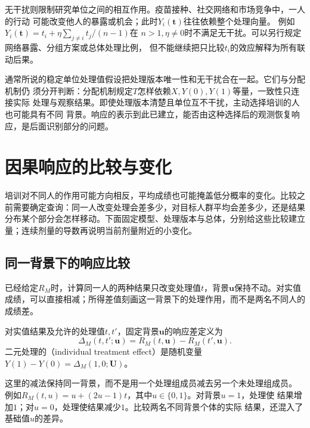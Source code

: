 无干扰则限制研究单位之间的相互作用。疫苗接种、社交网络和市场竞争中，一人的行动
可能改变他人的暴露或机会；此时\(Y_i(\bm t)\)往往依赖整个处理向量。
例如\(Y_i(\bm t)=t_i+\eta\sum_{j\ne i}t_j/(n-1)\)在
\(n>1,\eta\ne0\)时不满足无干扰。可以另行规定网络暴露、分组方案或总体处理比例，
但不能继续把只比较\(t_i\)的效应解释为所有联动后果。

通常所说的稳定单位处理值假设把处理版本唯一性和无干扰合在一起。它们与分配机制仍
须分开判断：分配机制规定\(T\)怎样依赖\(X,Y(0),Y(1)\)等量，一致性只连接实际
处理与观察结果。即使处理版本清楚且单位互不干扰，主动选择培训的人也可能具有不同
背景。响应的表示到此已建立，能否由这种选择后的观测恢复响应，是后面识别部分的问题。

\section{因果响应的比较与变化}
\label{sec:causal-response-comparison}

培训对不同人的作用可能方向相反，平均成绩也可能掩盖低分概率的变化。比较之前需要确定查询：同一人改变处理会差多少，对目标人群平均会差多少，还是结果分布某个部分会怎样移动。下面固定模型、处理版本与总体，分别给这些比较建立量；连续剂量的导数再说明当前剂量附近的小变化。

\subsection{同一背景下的响应比较}
\label{sec:causal-individual-response}

已经给定\(R_M\)时，计算同一人的两种结果只改变处理值\(t\)，背景\(\bm u\)保持不动。对实值成绩，可以直接相减；所得差值刻画这一背景下的处理作用，而不是两名不同人的成绩差。

\begin{definition}[同一背景下的响应差]
  \label{def:causal-individual-effect}
  对实值结果及允许的处理值\(t,t'\)，固定背景\(\bm u\)的响应差定义为
  \begin{equation}
    \Delta_M(t,t';\bm u)=R_M(t,\bm u)-R_M(t',\bm u).
    \label{eq:causal-individual-response-difference}
  \end{equation}
  二元处理的（individual treatment effect）是随机变量
  \(Y(1)-Y(0)=\Delta_M(1,0;\bm U)\)。
\end{definition}

这里的减法保持同一背景，而不是用一个处理组成员减去另一个未处理组成员。
例如\(R_M(t,u)=u+(2u-1)t\)，其中\(u\in\{0,1\}\)。对背景\(u=1\)，处理使
结果增加\(1\)；对\(u=0\)，处理使结果减少\(1\)。比较两名不同背景个体的实际
结果，还混入了基础值\(u\)的差异。

